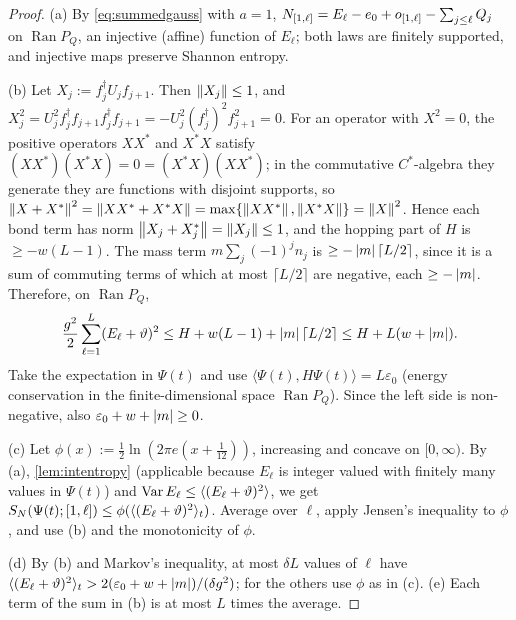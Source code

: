 \begin{proof}
(a) By \eqref{eq:summedgauss} with $a=1$, $N_{[1,\ell]}=E_\ell-e_0+o_{[1,\ell]}-\sum_{j\le\ell}Q_j$ on
$\operatorname{Ran}P_Q$, an injective (affine) function of $E_\ell$; both laws are finitely supported, and
injective maps preserve Shannon entropy.

(b) Let $X_j:=f_j^\dagger U_jf_{j+1}$.  Then $\left\|X_j\right\|\le1$, and $X_j^2=U_j^2f_j^\dagger f_{j+1}f_j^\dagger f_{j+1}=
-U_j^2(f_j^\dagger)^2f_{j+1}^2=0$.  For an operator with $X^2=0$, the positive operators $XX^*$ and $X^*X$ satisfy
$(XX^*)(X^*X)=0=(X^*X)(XX^*)$; in the commutative $C^*$-algebra they generate they are functions with disjoint
supports, so $\left\|X+X^*\right\|^2=\left\|XX^*+X^*X\right\|=\max\{\left\|XX^*\right\|,\left\|X^*X\right\|\}=\left\|X\right\|^2$.  Hence each bond term has
norm $\left\|X_j+X_j^*\right\|=\left\|X_j\right\|\le1$, and the hopping part of $H$ is $\ge-w(L-1)$.  The mass term
$m\sum_j(-1)^jn_j$ is $\ge-\left|m\right|\lceil L/2\rceil$, since it is a sum of commuting terms of which at most
$\lceil L/2\rceil$ are negative, each $\ge-\left|m\right|$.  Therefore, on $\operatorname{Ran}P_Q$,
\[
  \frac{g^2}2\sum_{\ell=1}^L(E_\ell+\vartheta)^2\le H+w(L-1)+\left|m\right|\lceil L/2\rceil\le H+L(w+\left|m\right|).
\]
Take the expectation in $\Psi(t)$ and use $\langle\Psi(t),H\Psi(t)\rangle=L\varepsilon_0$ (energy conservation in
the finite-dimensional space $\operatorname{Ran}P_Q$).  Since the left side is non-negative, also
$\varepsilon_0+w+\left|m\right|\ge0$.

(c) Let $\phi(x):=\frac12\ln(2\pi e(x+\frac1{12}))$, increasing and concave on $[0,\infty)$.  By (a),
\cref{lem:intentropy} (applicable because $E_\ell$ is integer valued with finitely many values in $\Psi(t)$) and
$\operatorname{Var} E_\ell\le\langle(E_\ell+\vartheta)^2\rangle$, we get $S_{N}(\Psi(t);[1,\ell])\le\phi(\langle(E_\ell+\vartheta)^2\rangle_t)$.
Average over $\ell$, apply Jensen's inequality to $\phi$, and use (b) and the monotonicity of $\phi$.

(d) By (b) and Markov's inequality, at most $\delta L$ values of $\ell$ have
$\langle(E_\ell+\vartheta)^2\rangle_t>2(\varepsilon_0+w+\left|m\right|)/(\delta g^2)$; for the others use $\phi$ as in (c).
(e) Each term of the sum in (b) is at most $L$ times the average.
\end{proof}

